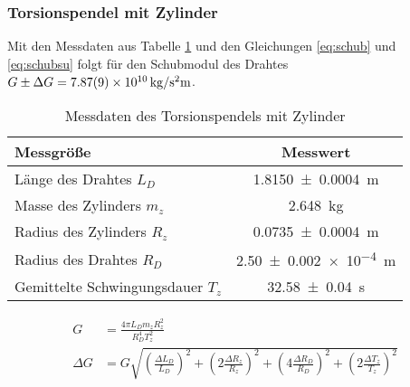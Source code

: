  
 \subsubsection*{Torsionspendel mit Zylinder}
 
 Mit den Messdaten aus Tabelle \ref{tab:dataTZ} und den Gleichungen \ref{eq:schub} und \ref{eq:schubsu} folgt für den Schubmodul  des Drahtes $G\pm \Delta G =\SI{7.87+-0.09e10}{kg \per \second \squared  \metre}$.
 
 
\begin{table}[h]
\centering	
\caption{Messdaten des Torsionspendels mit Zylinder}
 \begin{tabular}{|l|c|} 
 	\hline 
 Messgröße	& Messwert  \\ 
 	\hline 
 	Länge des Drahtes $L_D$& \SI{1.8150\pm 0.0004 } {m} \\ 
 	\hline 
 	Masse des Zylinders $m_z$& \SI{2.648}{kg} \\ 
 	\hline 
 	Radius des Zylinders $R_z$ & \SI{0.0735 \pm 0.0004}{m}  \\ 
 	\hline 
 	Radius des Drahtes $R_D$ & \SI{2.50+-0.002 e-4} {m} \\ 
 	\hline 
 	Gemittelte Schwingungsdauer $T_z$&\SI{32.58+-0.04}{s}  \\ 
 	\hline 
 \end{tabular} 

	\label{tab:dataTZ}
\end{table} 




\begin{align}
	G&= \frac{4 \pi L_D m_z R_z^2}{R_D^4 T_z^2}
	\label{eq:schub}\\
	\Delta G &= G \sqrt{
		\left( \frac{\Delta L_D}{L_D} \right)^2+
		\left(2 \frac{\Delta R_z}{R_z} \right)^2+
		\left( 4 \frac{\Delta R_D}{R_D} \right)^2+
		\left( 2 \frac{\Delta T_z}{T_z} \right)^2 } \label{eq:schubsu}
\end{align}




